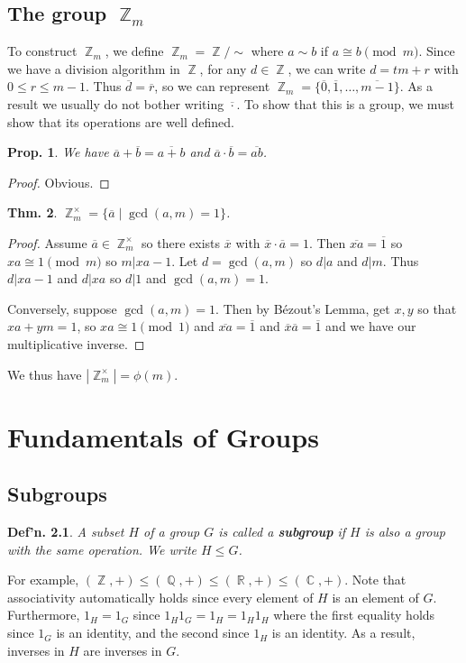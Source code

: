 \documentclass[12pt, a4paper]{book}
\DeclareMathOperator{\Q}{\mathbb{Q}}
\DeclareMathOperator{\Z}{\mathbb{Z}}
\DeclareMathOperator{\R}{\mathbb{R}}
\DeclareMathOperator{\C}{\mathbb{C}}
\newtheorem{theorem}{Thm.}[section]
\newtheorem{definition}[theorem]{Def'n.}
\newtheorem{proposition}[theorem]{Prop.}
\theoremstyle{nonumberplain}
\newtheorem{proof}{Proof}
\begin{document}
\section{The group $\Z_m$}
To construct $\Z_m$, we define $\Z_m=\Z/\sim$ where $a\sim b$ if $a\cong b\pmod{m}$.
Since we have a division algorithm in $\Z$, for any $d\in\Z$, we can write $d=tm+r$ with $0\leq r\leq m-1$.
Thus $\overline{d}=\overline{r}$, so we can represent $\Z_m=\{\overline{0},\overline{1},\ldots,\overline{m-1}\}$.
As a result we usually do not bother writing $\overline{\cdot}$.
To show that this is a group, we must show that its operations are well defined.
\begin{proposition}
    We have $\overline{a}+\overline{b}=\overline{a+b}$ and $\overline{a}\cdot\overline{b}=\overline{ab}$.
\end{proposition}
\begin{proof}
    Obvious.
\end{proof}
\begin{theorem}
    $\Z_m^\times=\{\overline{a}\mid\gcd(a,m)=1\}$.
\end{theorem}
\begin{proof}
    Assume $\overline{a}\in\Z^\times_m$ so there exists $\overline{x}$ with $\overline{x}\cdot\overline{a}=1$.
    Then $\overline{xa}=\overline{1}$ so $xa\cong 1\pmod{m}$ so $m|xa-1$.
    Let $d=\gcd(a,m)$ so $d|a$ and $d|m$.
    Thus $d|xa-1$ and $d|xa$ so $d|1$ and $\gcd(a,m)=1$.

    Conversely, suppose $\gcd(a,m)=1$.
    Then by B\'ezout's Lemma, get $x,y$ so that $xa+ym=1$, so $xa\cong 1\pmod{1}$ and $\overline{xa}=\overline{1}$ and $\overline{x}\overline{a}=\overline{1}$ and we have our multiplicative inverse.
\end{proof}
We thus have $|\Z_m^\times|=\phi(m)$.
\chapter{Fundamentals of Groups}
\section{Subgroups}
\begin{definition}
    A subset $H$ of a group $G$ is called a \textbf{subgroup} if $H$ is also a group with the same operation.
    We write $H\leq G$.
\end{definition}
For example, $(\Z,+)\leq(\Q,+)\leq(\R,+)\leq(\C,+)$.
Note that associativity automatically holds since every element of $H$ is an element of $G$.
Furthermore, $1_H=1_G$ since $1_H1_G=1_H=1_H1_H$ where the first equality holds since $1_G$ is an identity, and the second since $1_H$ is an identity.
As a result, inverses in $H$ are inverses in $G$.
\end{document}
